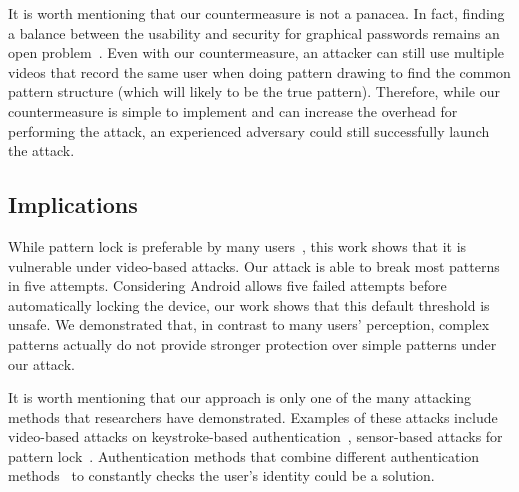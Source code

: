 It is worth mentioning that our countermeasure is not a panacea. In fact, finding a balance between the
usability and security for graphical passwords remains an open problem~\cite{Abdullah2008Towards}.
Even with our countermeasure, an attacker can still use multiple videos that record the same user when doing pattern
drawing to find the common pattern structure (which will likely to be the true pattern). Therefore, while our
countermeasure is simple to implement and can increase the overhead for performing the attack, an experienced
adversary could still successfully launch the attack.




\subsection{Implications}
While pattern lock is preferable by many users~\cite{androidstudy}, this     work shows
that it is vulnerable under video-based attacks. Our attack
is able to break most patterns in five attempts. Considering Android
allows five failed attempts before automatically locking the device, our work
shows that this default threshold is unsafe. We demonstrated that, in contrast to many users'
perception, complex patterns actually do not provide stronger protection over simple patterns under our attack.

It is worth mentioning that our approach is only one of the many attacking
methods that researchers have demonstrated. Examples of these attacks include
video-based attacks on keystroke-based authentication~\cite{shukla2014beware,yue2014blind}, sensor-based attacks for
pattern lock~\cite{zhang2016privacy}. Authentication methods that combine different
authentication methods~\cite{de2012touch,stefan2012robustness,lingsecure,mannan2007using} to constantly checks the user's identity could be
a solution. %



